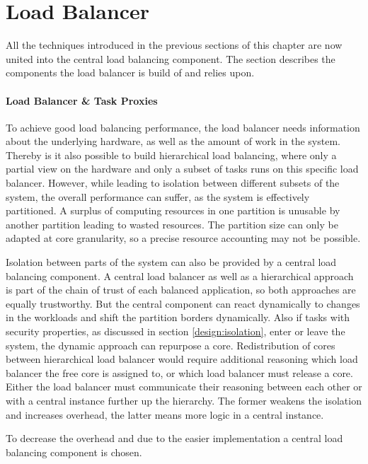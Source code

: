 \section{Load Balancer}
\label{design:threadmapper}

All the techniques introduced in the previous sections of this chapter
are now united into the central load balancing component.
The section describes the components the load balancer is build of and relies
upon.


\paragraph{Load Balancer \& Task Proxies}
To achieve good load balancing performance, the load balancer needs information
about the underlying hardware, as well as the amount of work in the system.
Thereby is it also possible to build hierarchical load balancing, where
only a partial view on the hardware and only a subset of tasks runs on this
specific load balancer.
However, while leading to isolation between different subsets of the system,
the overall performance can suffer, as the system is effectively partitioned.
A surplus of computing resources in one partition is unusable by another
partition leading to wasted resources.
The partition size can only be adapted at core granularity, so a precise
resource accounting may not be possible.

Isolation between parts of the system can also be provided by a central load
balancing component.
A central load balancer as well as a hierarchical approach is part of the chain
of trust of each balanced application, so both approaches are equally
trustworthy.
But the central component can react dynamically to changes in the workloads and
shift the partition borders dynamically.
Also if tasks with security properties, as discussed in section
\ref{design:isolation}, enter or leave the system, the dynamic approach can
repurpose a core.
Redistribution of cores between hierarchical load balancer would require
additional reasoning which load balancer the free core is assigned to, or which
load balancer must release a core.
Either the load balancer must communicate their reasoning between each other or
with a central instance further up the hierarchy.
The former weakens the isolation and increases overhead, the latter means more
logic in a central instance.

To decrease the overhead and due to the easier implementation a central load
balancing component is chosen.

